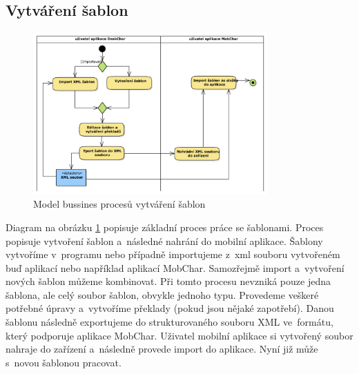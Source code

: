 \documentclass[thesis=B,czech]{resources/FITthesis}[2012/06/26]
\begin{document}
\subsection{Vytváření šablon} \label{sec:vytvareni_sablon}
\begin{figure}\centering
	\includegraphics[width=0.8\textwidth]{images/bussiness_sablony}
	\caption[Business proces vytváření šablon]{Model bussines procesů vytváření šablon}\label{fig:bp_sablony}
\end{figure}
Diagram na obrázku \ref{fig:bp_sablony} popisuje základní proces práce se šablonami. Proces popisuje vytvoření šablon a~následné nahrání do mobilní aplikace. Šablony vytvoříme v~programu nebo případně importujeme z~xml souboru vytvořeném buď aplikací nebo například aplikací MobChar. Samozřejmě import a~vytvoření nových šablon můžeme kombinovat. Při tomto procesu nevzniká pouze jedna šablona, ale celý soubor šablon, obvykle jednoho typu. Provedeme veškeré potřebné úpravy a~vytvoříme překlady (pokud jsou nějaké zapotřebí). Danou šablonu následně exportujeme do strukturovaného souboru XML ve~formátu, který podporuje aplikace MobChar. Uživatel mobilní aplikace si vytvořený soubor nahraje do zařízení a~následně provede import do aplikace. Nyní již může s~novou šablonou pracovat.
\end{document}
